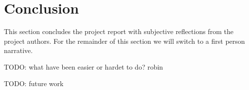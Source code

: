 
\section{Conclusion}
\label{sec:conclusion}

This section concludes the project report with subjective reflections from the project authors. For the remainder of this section we will switch to a first person narrative.

TODO: what have been easier or hardet to do? robin

TODO: future work





